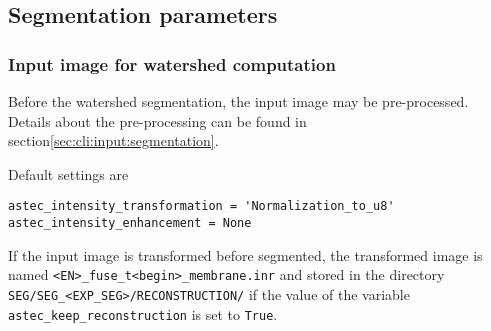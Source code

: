 
\subsection{Segmentation parameters}


\subsubsection{Input image for watershed computation}
\label{sec:cli:astec:input:watershed}

Before the watershed segmentation, the input image may be pre-processed. Details about the pre-processing can be found in section\ref{sec:cli:input:segmentation}.

Default settings are
\begin{verbatim}
astec_intensity_transformation = 'Normalization_to_u8'
astec_intensity_enhancement = None
\end{verbatim}

If the input image is transformed before segmented, the transformed image is named \texttt{<EN>\_fuse\_t<begin>\_membrane.inr} and stored in the directory \texttt{SEG/SEG\_<EXP\_SEG>/RECONSTRUCTION/} if the value of the variable \texttt{astec\_keep\_reconstruction} is set to \texttt{True}.
